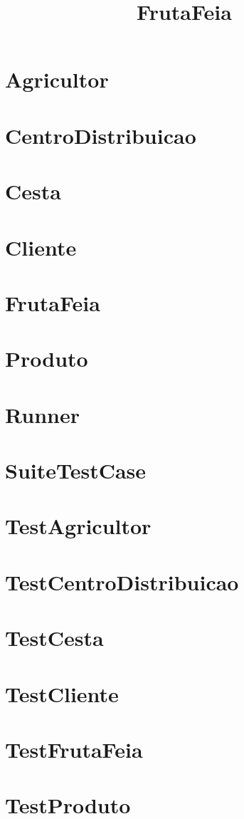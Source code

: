 \documentclass{article}
\begin{document}
\title{FrutaFeia}
\author{}
\maketitle
\tableofcontents

\section{Agricultor}

\section{CentroDistribuicao}

\section{Cesta}

\section{Cliente}

\section{FrutaFeia}

\section{Produto}

\section{Runner}

\section{SuiteTestCase}

\section{TestAgricultor}

\section{TestCentroDistribuicao}

\section{TestCesta}

\section{TestCliente}

\section{TestFrutaFeia}

\section{TestProduto}

\end{document}
